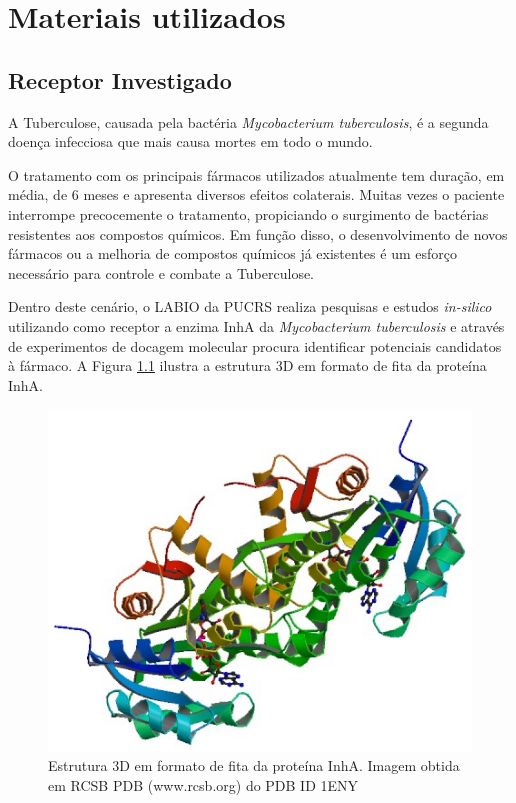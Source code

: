 \chapter{Materiais utilizados}

\section{Receptor Investigado}

A Tuberculose, causada pela bactéria \emph{Mycobacterium tuberculosis}, é a segunda doença infecciosa que mais causa mortes em todo o mundo. 

O tratamento com os principais fármacos utilizados atualmente tem duração, em média, de 6 meses e apresenta diversos efeitos colaterais. Muitas vezes o paciente interrompe precocemente o tratamento, propiciando o surgimento de bactérias resistentes aos compostos químicos. Em função disso, o desenvolvimento de novos fármacos ou a melhoria de compostos químicos já existentes é um esforço necessário para controle e combate a Tuberculose.

Dentro deste cenário, o LABIO da PUCRS realiza pesquisas e estudos \emph{in-silico} utilizando como receptor a enzima InhA da \emph{Mycobacterium tuberculosis} e através de experimentos de docagem molecular procura identificar potenciais candidatos à fármaco. A Figura \ref{fig:inha} ilustra a estrutura 3D em formato de fita da proteína InhA.

\begin{figure}[h]
	\center
	\includegraphics[width=12cm]{images/inha.png}
	\caption{Estrutura 3D em formato de fita da proteína InhA. Imagem obtida em RCSB PDB (www.rcsb.org) do PDB ID 1ENY}
	\label{fig:inha}
\end{figure}

